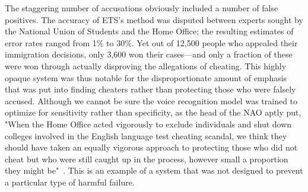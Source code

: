 \documentclass[acmconf,manuscript,screen,natbib=true]{acmart}
\begin{document}
The staggering number of accusations obviously included a number of false positives. The accuracy of ETS's method was disputed between experts sought by the National Union of Students and the Home Office; the resulting estimates of error rates ranged from 1\% to 30\%.
Yet out of 12,500 people who appealed their immigration decisions, only 3,600 won their cases---and only a fraction of these were won through actually disproving the allegations of cheating.
This highly opaque system was thus notable for the disproportionate amount of emphasis that was put into finding cheaters rather than protecting those who were falsely accused. Although we cannot be sure the voice recognition model was trained to optimize for sensitivity rather than specificity, as the head of the NAO aptly put, "When the Home Office acted vigorously to exclude individuals and shut down colleges involved in the English language test cheating scandal, we think they should have taken an equally vigorous approach to protecting those who did not cheat but who were still caught up in the process, however small a proportion they might be"~\cite{nao_ets}. This is an example of a system that was not designed to prevent a particular type of harmful failure.




\end{document}
